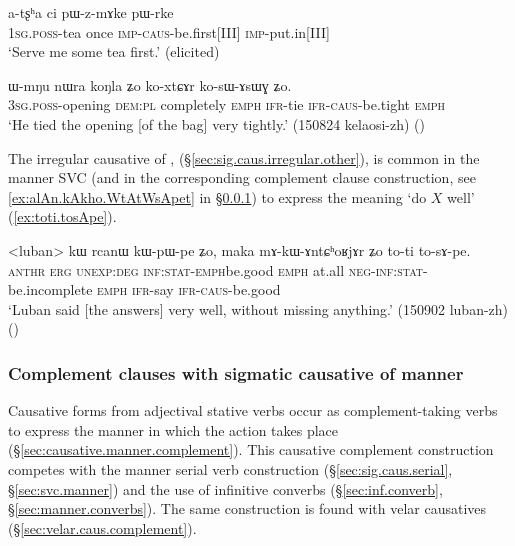 \begin{exe}
\ex \label{ex:pWzmAke}
\gll a-tʂʰa ci pɯ-z-mɤke pɯ-rke \\
\textsc{1sg}.\textsc{poss}-tea once \textsc{imp}-\textsc{caus}-be.first[III] \textsc{imp}-put.in[III] \\
\glt `Serve me some tea first.' (elicited)
\end{exe} 

\begin{exe}
\ex \label{ex:koxtCAr.kosAsWG}
\gll  ɯ-mŋu nɯra koŋla ʑo ko-xtɕɤr ko-sɯ-ɤsɯɣ ʑo. \\
\textsc{3sg}.\textsc{poss}-opening \textsc{dem}:\textsc{pl} completely \textsc{emph} \textsc{ifr}-tie \textsc{ifr}-\textsc{caus}-be.tight \textsc{emph} \\
\glt `He tied the opening [of the bag] very tightly.' (150824 kelaosi-zh)
()
\end{exe} 

The irregular causative of ,  (§\ref{sec:sig.caus.irregular.other}), is common in the manner SVC (and in the corresponding complement clause construction, see \ref{ex:alAn.kAkho.WtAtWsApet} in §\ref{sec:sig.caus.complement}) to express the meaning `do $X$ well' (\ref{ex:toti.tosApe}).

\begin{exe}
\ex \label{ex:toti.tosApe}
\gll <luban> kɯ rcanɯ kɯ-pɯ-pe ʑo, maka mɤ-kɯ-ɤntɕʰoʁjɤr ʑo to-ti to-sɤ-pe.  \\
  \textsc{anthr} \textsc{erg} \textsc{unexp}:\textsc{deg} \textsc{inf}:\textsc{stat}-\textsc{emph}\redp{}be.good \textsc{emph} at.all \textsc{neg}-\textsc{inf}:\textsc{stat}-be.incomplete \textsc{emph} \textsc{ifr}-say \textsc{ifr}-\textsc{caus}-be.good \\
\glt `Luban said [the answers] very well, without missing anything.' (150902 luban-zh)
()
\end{exe} 



\subsubsection{Complement clauses with sigmatic causative of manner} \label{sec:sig.caus.complement}
Causative forms from adjectival stative verbs occur as com\-ple\-ment-taking verbs to express the manner in which the action takes place (§\ref{sec:causative.manner.complement}). This causative complement construction competes with the manner serial verb construction (§\ref{sec:sig.caus.serial}, §\ref{sec:svc.manner}) and the use of infinitive converbs (§\ref{sec:inf.converb}, §\ref{sec:manner.converbs}). The same construction is found with velar causatives (§\ref{sec:velar.caus.complement}).

